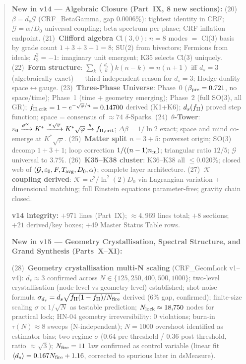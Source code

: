 \documentclass[12pt, a4paper]{article}
\begin{document}
\begin{abstract}
\textbf{New in v14 --- Algebraic Closure (Part~IX, 8 new sections):}
(20)~\textbf{$\beta=d_s\mathcal{G}$} (CRF\_BetaGamma, gap 0.0006\%): tightest identity in CRF;
$\mathcal{G}=\alpha/D_0$ universal coupling; beta spectrum per phase; CRF inflation endpoint.
(21)~\textbf{Clifford algebra $\mathrm{Cl}(3,0)$}: $n=8$ modes $=$ Cl(3) basis by grade count
$1+3+3+1=8$; SU(2) from bivectors; Fermions from ideals; $I_3^2=-1$: imaginary unit emergent;
K35 selects Cl(3) uniquely.
(22)~\textbf{Form structure}: $\sum_{k}\binom{d_s}{k}k(n-k)=n(n+1)$ iff $d_s=3$ (algebraically
exact) --- third independent reason for $d_s=3$; Hodge duality space$\leftrightarrow$gauge.
(23)~\textbf{Three-Phase Universe}: Phase~0 ($\beta_{\rm pre}=0.721$, no space/time);
Phase~1 (time + geometry emerging); Phase~2 (full SO(3), all GR);
$f_{\rm II,crit}=1-e^{-\sqrt{\varphi}/n}=0.14700$ derived (K1+K6);
$d_s(f_{\rm II})$ proved step function; space = consensus of ${\approx}74$ $\delta$-Sparks.
(24)~\textbf{$\theta$-Tower}: $\varepsilon_0\xrightarrow{\theta^\infty}K^*\xrightarrow{\times\sqrt{\varphi}}
K^*\sqrt{\varphi}\xrightarrow{\theta}f_{\rm II,crit}$; $\Delta\beta=1/\ln2$ exact;
space and mind co-emerge at $K^*\sqrt{\varphi}$.
(25)~\textbf{Matter split $n=3+5$}: powerset origin; SO(3) decomp $1+3+1$;
loop correction $1/((n-1)n_{\rm m})$; triangular ratio $12/5$; $\mathcal{G}$ universal to 3.7\%.
(26)~\textbf{K35--K38 cluster}: K36--K38 all $\leq 0.020\%$; closed web of
$(\mathcal{G},\varepsilon_0,F,T_{\rm avg},D_0,\alpha)$; complete layer architecture.
(27)~\textbf{$\mathcal{K}$ coupling derived}: $\mathcal{K}=c^2/\ln^2(2)D_0$ via Lagrangian
variation + dimensional matching; full Einstein equations parameter-free; gravity chain closed.

\textbf{v14 integrity:} $+971$ lines (Part~IX); $\approx 4{,}969$ lines total;
$+8$ sections; $+21$ derived/key boxes; $+49$ Master Status Table rows.

\textbf{New in v15 --- Geometry Crystallisation, Spectral Structure, and Grand Synthesis (Parts~X--XI):}

(28)~\textbf{Geometry crystallisation multi-N scaling} (CRF\_GeomLock v1--v4): $d_s\approx 3$ confirmed across $N\in\{125,250,400,500,1000\}$; two-level crystallisation (node-level vs geometry-level) established; shot-noise formula $\sigma_{d_s} = d_s\sqrt{f_{\rm II}(1-f_{\rm II})/N_{\rm fire}}$ derived (6\% gap, confirmed); finite-size scaling $\sigma\propto 1/\sqrt{N}$ as testable prediction; $N_{\rm lock}\approx 18{,}750$ nodes for practical lock; HN-04 geometry irreversibility: 0 violations; burn-in $\tau(N)\approx 8$ sweeps (N-independent); $N=1000$ overshoot identified as estimator bias; two-regime $\sigma$ (0.64 pre-threshold / 0.36 post-threshold, ratio $\approx\sqrt{3}$); $N_{\rm fire}=11$ law confirmed as control variable (linear fit $\langle d_s\rangle=0.167N_{\rm fire}+1.16$, corrected to spurious later in dsMeasure).


\end{abstract}
\end{document}
